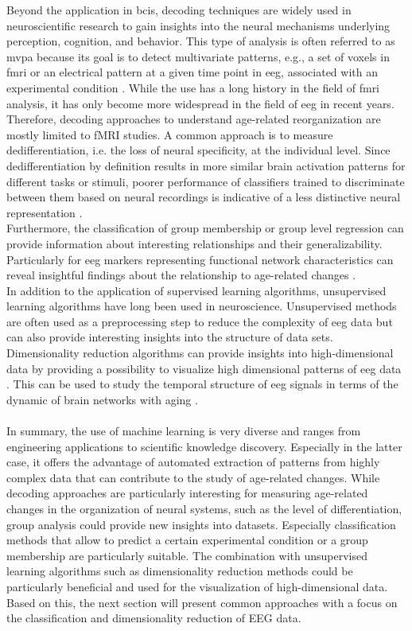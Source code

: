 Beyond the application in \glspl{bci}, decoding techniques are widely used in neuroscientific research to gain insights into the neural mechanisms underlying perception, cognition, and behavior. This type of analysis is often referred to as \gls{mvpa} because its goal is to detect multivariate patterns, e.g., a set of voxels in \gls{fmri} or an electrical pattern at a given time point in \gls{eeg}, associated with an experimental condition \cite{Holdgraf2017}. While the use has a long history in the field of \gls{fmri} analysis, it has only become more widespread in the field of \gls{eeg} in recent years.  Therefore, decoding approaches to understand age-related reorganization are mostly limited to fMRI studies. A common approach is to measure dedifferentiation, i.e. the loss of neural specificity, at the individual level. Since dedifferentiation by definition results in more similar brain activation patterns for different tasks or stimuli, poorer performance of classifiers trained to discriminate between them based on neural recordings is indicative of a less distinctive neural representation \cite{Koen2019, Park2010}. \\ 
Furthermore, the classification of group membership or group level regression can provide information about interesting relationships and their generalizability. Particularly for \gls{eeg} markers representing functional network characteristics can reveal insightful findings about the relationship to age-related changes \cite{Petti2016}.\\
In addition to the application of supervised learning algorithms, unsupervised learning algorithms have long been used in neuroscience. Unsupervised methods are often used as a preprocessing step to reduce the complexity of \gls{eeg} data but can also provide interesting insights into the structure of data sets. Dimensionality reduction algorithms can provide insights into high-dimensional data by providing a possibility to visualize high dimensional patterns of \gls{eeg} data \cite{Kottlarz2020, Banville2021}. This can be used to study the temporal structure of \gls{eeg} signals in terms of the dynamic of brain networks with aging \cite{Brunton2016, vieluf2018age}.\\
\\
In summary, the use of machine learning is very diverse and ranges from engineering applications to scientific knowledge discovery. Especially in the latter case, it offers the advantage of automated extraction of patterns from highly complex data that can contribute to the study of age-related changes. While decoding approaches are particularly interesting for measuring age-related changes in the organization of neural systems, such as the level of differentiation, group analysis could provide new insights into datasets. Especially classification methods that allow to predict a certain experimental condition or a group membership are particularly suitable. The combination with unsupervised learning algorithms such as dimensionality reduction methods could be particularly beneficial and used for the visualization of high-dimensional data. Based on this, the next section will present common approaches with a focus on the classification and dimensionality reduction of EEG data.

